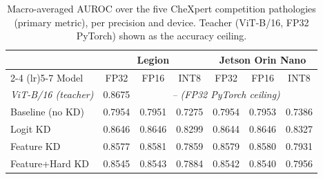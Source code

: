 \begin{table}[t]
\centering
\caption{Macro-averaged AUROC over the five CheXpert competition pathologies (primary metric), per precision and device. Teacher (ViT-B/16, FP32 PyTorch) shown as the accuracy ceiling.}
\label{tab:auroc_macro5}
\begin{tabular}{lcccccc}
\toprule
 & \multicolumn{3}{c}{Legion} & \multicolumn{3}{c}{Jetson Orin Nano} \\
\cmidrule(lr){2-4} \cmidrule(lr){5-7}
Model & FP32 & FP16 & INT8 & FP32 & FP16 & INT8 \\
\midrule
\textit{ViT-B/16 (teacher)} & 0.8675 & \multicolumn{5}{c}{\textit{-- (FP32 PyTorch ceiling)}} \\
\midrule
Baseline (no KD) & 0.7954 & 0.7951 & 0.7275 & 0.7954 & 0.7953 & 0.7386 \\
Logit KD & 0.8646 & 0.8646 & 0.8299 & 0.8644 & 0.8646 & 0.8327 \\
Feature KD & 0.8577 & 0.8581 & 0.7859 & 0.8579 & 0.8580 & 0.7931 \\
Feature+Hard KD & 0.8545 & 0.8543 & 0.7884 & 0.8542 & 0.8540 & 0.7956 \\
\bottomrule
\end{tabular}
\end{table}
